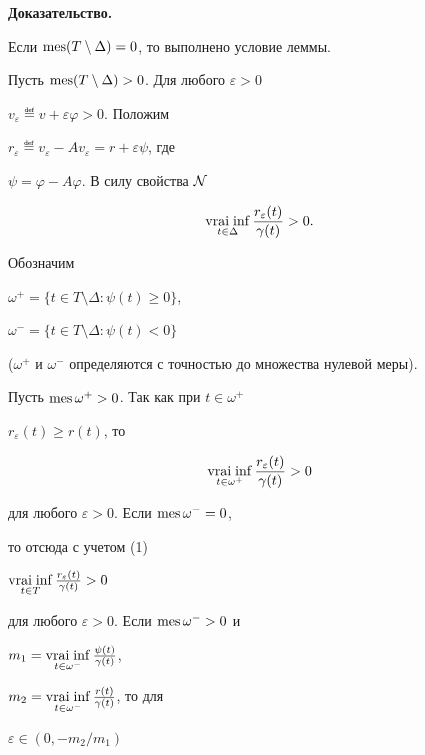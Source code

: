 {\bf Доказательство.}


Если $\operatorname{mes}(T\setminus\Delta)=0$, то выполнено условие леммы.





Пусть $\operatorname{mes}(T\setminus\Delta)>0$. Для любого $\varepsilon>0$\;


$v_\varepsilon\eqdef v+\varepsilon \varphi>0$. Положим


$r_{\varepsilon}\eqdef v_\varepsilon - A v_\varepsilon


= r + \varepsilon \psi$, где


$\psi=\varphi - A\varphi$. В силу свойства $\cal N$


\begin{equation}


\vraiinf_{t\in\Delta} \frac{r_{\varepsilon}(t)}{\gamma(t)} >0.


\end{equation}





Обозначим


$\omega^+=\{t\in T\setminus\Delta:\psi(t)\geq 0\}$,


$\omega^-=\{t\in T\setminus\Delta:\psi(t)< 0\}$


($\omega^+$ и $\omega^-$ определяются с точностью до множества нулевой меры).





Пусть $\operatorname{mes}\omega^+>0$. Так как при $t\in\omega^+$\;


$r_{\varepsilon}(t) \geq r(t)$, то


\begin{equation}


\vraiinf_{t\in\omega^+} \frac{r_{\varepsilon}(t)}{\gamma(t)} >0


\end{equation}


для любого $\varepsilon>0$. Если $\operatorname{mes}\omega^- =0$,


то отсюда с учетом (1)


$\vraiinf\limits_{t\in T} \frac{r_{\varepsilon}(t)}{\gamma(t)} >0$


для любого $\varepsilon>0$. Если $\operatorname{mes}\omega^- >0$ и


$m_1=\vraiinf\limits_{t\in\omega^-} \frac{\psi(t)}{\gamma(t)}$,


$m_2 =\vraiinf\limits_{t\in\omega^-} \frac{r(t)}{\gamma(t)}$, то для


$\varepsilon\in (0,-m_2/m_1)$\;


